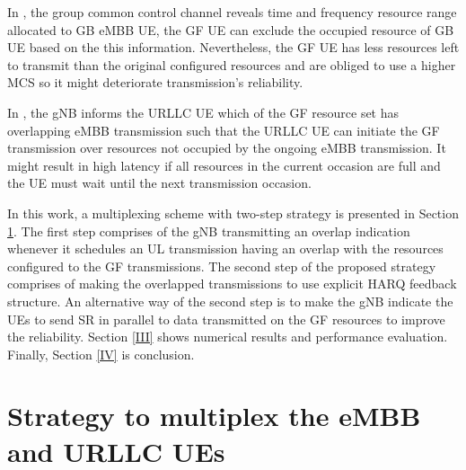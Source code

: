 \documentclass[conference]{IEEEtran}
\begin{document}
In \cite{b7}, the group common control channel reveals time and frequency resource range allocated to GB eMBB UE, the GF UE can exclude the occupied resource of GB UE based on the this information. Nevertheless, the GF UE has less resources left to transmit than the original configured resources and are obliged to use a higher MCS so it might deteriorate transmission's reliability.

In \cite{b9}, the gNB informs the URLLC UE which of the GF resource set has overlapping eMBB transmission such that the URLLC UE can initiate the GF transmission over resources not occupied by the ongoing eMBB transmission. It might result in high latency if all resources in the current occasion are full and the UE must wait until the next transmission occasion.

In this work, a multiplexing scheme with two-step strategy is presented in Section \ref{II}. The first step comprises of the gNB transmitting an overlap indication whenever it schedules an UL transmission having an overlap with the resources configured to the GF transmissions. The second step of the proposed strategy comprises of making the overlapped transmissions to use explicit HARQ feedback structure. An alternative way of the second step is to make the gNB indicate the UEs to send SR in parallel to data transmitted on the GF resources to improve the reliability. Section \ref{III} shows numerical results and performance evaluation. Finally, Section \ref{IV} is conclusion.


\section{Strategy to multiplex the eMBB and URLLC UEs}\label{II}
\end{document}
